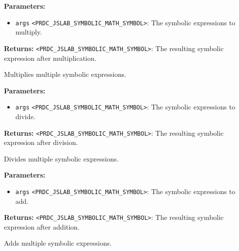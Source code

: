 \documentclass[12pt,a4paper]{article}
\begin{document}
\vspace{5mm}
\noindent {}


\noindent \textbf{Parameters:}
\begin{itemize}
  \item \texttt{args} \texttt{<PRDC\_JSLAB\_SYMBOLIC\_MATH\_SYMBOL>}: The symbolic expressions to multiply.
\end{itemize}

\noindent \textbf{Returns:} \texttt{<PRDC\_JSLAB\_SYMBOLIC\_MATH\_SYMBOL>}: The resulting symbolic expression after multiplication.

\noindent Multiplies multiple symbolic expressions.

\vspace{5mm}
\noindent {}


\noindent \textbf{Parameters:}
\begin{itemize}
  \item \texttt{args} \texttt{<PRDC\_JSLAB\_SYMBOLIC\_MATH\_SYMBOL>}: The symbolic expressions to divide.
\end{itemize}

\noindent \textbf{Returns:} \texttt{<PRDC\_JSLAB\_SYMBOLIC\_MATH\_SYMBOL>}: The resulting symbolic expression after division.

\noindent Divides multiple symbolic expressions.

\vspace{5mm}
\noindent {}


\noindent \textbf{Parameters:}
\begin{itemize}
  \item \texttt{args} \texttt{<PRDC\_JSLAB\_SYMBOLIC\_MATH\_SYMBOL>}: The symbolic expressions to add.
\end{itemize}

\noindent \textbf{Returns:} \texttt{<PRDC\_JSLAB\_SYMBOLIC\_MATH\_SYMBOL>}: The resulting symbolic expression after addition.

\noindent Adds multiple symbolic expressions.

\vspace{5mm}
\noindent {}
\end{document}
